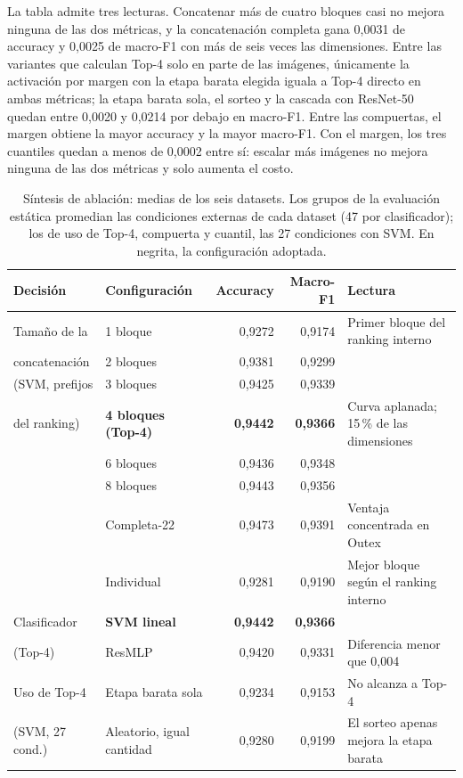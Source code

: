 \documentclass[a4paper,fleqn]{cas-sc}
\begin{document}
La tabla admite tres lecturas. Concatenar más de cuatro bloques casi no mejora ninguna de las dos métricas, y la concatenación completa gana 0,0031 de accuracy y 0,0025 de macro-F1 con más de seis veces las dimensiones. Entre las variantes que calculan Top-4 solo en parte de las imágenes, únicamente la activación por margen con la etapa barata elegida iguala a Top-4 directo en ambas métricas; la etapa barata sola, el sorteo y la cascada con ResNet-50 quedan entre 0,0020 y 0,0214 por debajo en macro-F1. Entre las compuertas, el margen obtiene la mayor accuracy y la mayor macro-F1. Con el margen, los tres cuantiles quedan a menos de 0,0002 entre sí: escalar más imágenes no mejora ninguna de las dos métricas y solo aumenta el costo.

\begin{table}[pos=htbp]
\centering
\caption{Síntesis de ablación: medias de los seis datasets. Los grupos de la evaluación estática promedian las condiciones externas de cada dataset (47 por clasificador); los de uso de Top-4, compuerta y cuantil, las 27 condiciones con SVM. En negrita, la configuración adoptada.}
\label{tab:ablacion}
\footnotesize
\begin{tabular}{@{}llrrp{5.2cm}@{}}
\toprule
Decisión & Configuración & Accuracy & Macro-F1 & Lectura \\
\midrule
Tamaño de la & 1 bloque & 0,9272 & 0,9174 & Primer bloque del ranking interno \\
concatenación & 2 bloques & 0,9381 & 0,9299 & \\
(SVM, prefijos & 3 bloques & 0,9425 & 0,9339 & \\
del ranking) & \textbf{4 bloques (Top-4)} & \textbf{0,9442} & \textbf{0,9366} & Curva aplanada; 15\,\% de las dimensiones \\
 & 6 bloques & 0,9436 & 0,9348 & \\
 & 8 bloques & 0,9443 & 0,9356 & \\
 & Completa-22 & 0,9473 & 0,9391 & Ventaja concentrada en Outex \\
 & Individual & 0,9281 & 0,9190 & Mejor bloque según el ranking interno \\
\addlinespace
Clasificador & \textbf{SVM lineal} & \textbf{0,9442} & \textbf{0,9366} & \\
(Top-4) & ResMLP & 0,9420 & 0,9331 & Diferencia menor que 0,004 \\
\addlinespace
Uso de Top-4 & Etapa barata sola & 0,9234 & 0,9153 & No alcanza a Top-4 \\
(SVM, 27 cond.) & Aleatorio, igual cantidad & 0,9280 & 0,9199 & El sorteo apenas mejora la etapa barata \\

\end{tabular}
\end{table}
\end{document}
